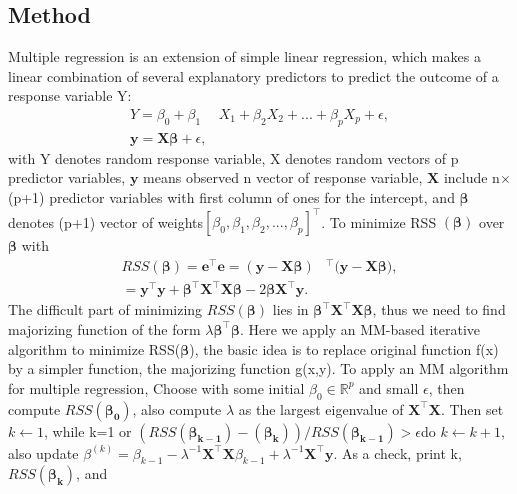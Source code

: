 \documentclass[
]{article}
\begin{document}
\hypertarget{Method}{%
\subsection{Method}\label{Method}}

Multiple regression is an extension of simple linear regression, which
makes a linear combination of several explanatory predictors to predict
the outcome of a response variable Y: \[
\begin{align}
Y = \beta_0 + \beta_1 &X_1+\beta_2 X_2 +...+ \beta_p X_p + \epsilon,
\\
\boldsymbol{y} = \mathbf{X} \boldsymbol{\beta} + \epsilon,
\end{align}
\] with Y denotes random response variable, X denotes random vectors of
p predictor variables, \(\boldsymbol{y}\) means observed n vector of
response variable, \(\mathbf{X}\) include n\(\times\)(p+1) predictor
variables with first column of ones for the intercept, and
\(\boldsymbol{\beta}\) denotes (p+1) vector of
weights\([\beta_0, \beta_1, \beta_2,...,\beta_p]^\top\). To minimize RSS
\((\boldsymbol{\beta})\) over \(\boldsymbol{\beta}\) with \[
\begin{align}
RSS (\boldsymbol{\beta}) = \mathbf{e}^\top \mathbf{e} = (\mathbf{y-X\boldsymbol{\beta}})&^\top (\mathbf{y-X\boldsymbol{\beta})},
\\
=\mathbf{y}^\top \mathbf{y} + \boldsymbol{\beta}^\top\mathbf{X}^\top\mathbf{X}\boldsymbol{\beta} -2\boldsymbol{\beta}\mathbf{X}^\top \mathbf{y}.
\end{align}
\] The difficult part of minimizing \(RSS (\boldsymbol{\beta})\) lies in
\(\boldsymbol{\beta}^\top\mathbf{X}^\top\mathbf{X}\boldsymbol{\beta}\),
thus we need to find majorizing function of the form
\(\lambda\boldsymbol{\beta}^\top\boldsymbol{\beta}\). Here we apply an
MM-based iterative algorithm to minimize RSS(\(\boldsymbol{\beta}\)),
the basic idea is to replace original function f(x) by a simpler
function, the majorizing function g(x,y). To apply an MM algorithm for
multiple regression, Choose with some initial \(\beta_0\in\mathbb{R}^p\)
and small \(\epsilon\), then compute \(RSS (\boldsymbol{\beta_0})\),
also compute \(\lambda\) as the largest eigenvalue of
\(\mathbf{X}^\top\mathbf{X}\). Then set \(k\leftarrow1\), while k=1 or
\((RSS (\boldsymbol{\beta_{k-1}})-(\boldsymbol{\beta_{k}}))/RSS (\boldsymbol{\beta_{k-1}})>\epsilon\)do
\(k\leftarrow k+1\), also update
\(\beta^{(k)} = \beta_{k-1} - \lambda^{-1}\mathbf{X}^\top\mathbf{X}\beta_{k-1} +\lambda^{-1}\mathbf{X}^\top\mathbf{y}\).
As a check, print k,\(RSS (\boldsymbol{\beta_{k}})\), and
\end{document}
